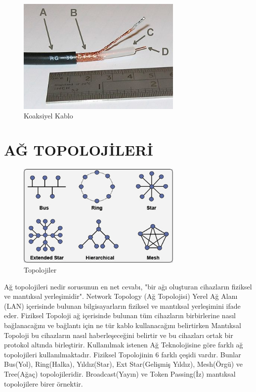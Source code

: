 \begin{figure}[H]
    \centering
    \includegraphics[width=8cm]{images/400px-RG-59}
    \caption{Koaksiyel Kablo}
    \label{fig:kooksiyel_kablo}
\end{figure}


\section*{AĞ TOPOLOJİLERİ }
\begin{figure}[H]
    \centering
    \includegraphics[width=8cm]{images/62_ağ_topolojisi}
    \caption{Topolojiler}
    \label{fig:topolojiler}
\end{figure}
Ağ topolojileri nedir sorusunun en net cevabı, "bir ağı oluşturan cihazların fiziksel ve mantıksal yerleşimidir". Network Topology (Ağ Topolojisi) Yerel Ağ Alanı (LAN) içerisinde bulunan bilgisayarların fiziksel ve mantıksal yerleşimini ifade eder. Fiziksel Topoloji ağ içerisinde bulunan tüm cihazların birbirlerine nasıl bağlanacağını ve bağlantı için ne tür kablo kullanacağını belirtirken Mantıksal Topoloji bu cihazların nasıl haberleşeceğini belirtir ve bu cihazları ortak bir protokol altında birleştirir. Kullanılmak istenen Ağ Teknolojisine göre farklı ağ topolojileri kullanılmaktadır.
Fiziksel Topolojinin 6 farklı çeşidi vardır. Bunlar Bus(Yol), Ring(Halka), Yıldız(Star), Ext Star(Gelişmiş Yıldız), Mesh(Örgü) ve Tree(Ağaç) topolojileridir. Broadcast(Yayın) ve Token Passing(İz) mantıksal topolojilere birer örnektir.

